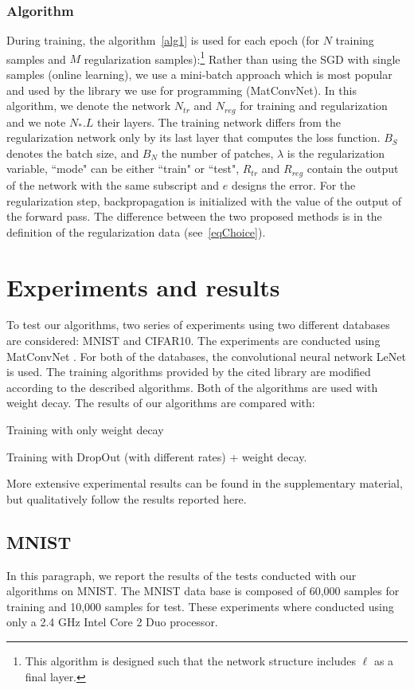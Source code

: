 \documentclass{article}
\begin{document}
\subsubsection{Algorithm}
During training, the algorithm~\ref{alg1} is used for each epoch (for $N$ training samples and $M$ regularization samples):\footnote{This algorithm is designed such that the network structure includes $\ell$ as a final layer.} Rather than using the SGD with single samples (online learning), we use a mini-batch approach which is most popular and used by the library we use for programming (MatConvNet). In this algorithm, we denote the network $N_{tr}$ and $N_{reg}$ for training and regularization and we note $N_*.L$ their layers. The training network differs from the regularization network only by its last layer that computes the loss function. $B_S$ denotes the batch size, and $B_N$ the number of patches, $\lambda$ is the regularization variable, ``mode" can be either ``train" or ``test", $R_{tr}$ and $R_{reg}$ contain the output of the network with the same subscript and $e$ designs the error. For the regularization step, backpropagation is initialized with the value of the output of the forward pass. The difference between the two proposed methods is in the definition of the regularization data (see~\eqref{eqChoice}).




\section{Experiments and results}
\label{experiment}
To test our algorithms, two series of experiments using two different databases are considered: MNIST and CIFAR10. The experiments are conducted using MatConvNet \cite{vedaldi15matconvnet}. For both of the databases, the convolutional neural network LeNet is used. The training algorithms provided by the cited library are modified according to the described algorithms. Both of the algorithms are used with weight decay. The results of our algorithms are compared with:
\begin{inparaenum}[(i)]
\item Training with only weight decay
\item Training with DropOut (with different rates) + weight decay. 
\end{inparaenum}
More extensive experimental results can be found in the supplementary material, but qualitatively follow the results reported here.

 
\subsection{MNIST}
In this paragraph, we report the results of the tests conducted with our algorithms on MNIST. The  MNIST data base is composed of 60,000 samples for training and 10,000 samples for test. These experiments where conducted using only a 2.4 GHz Intel Core 2 Duo processor.
\end{document}
